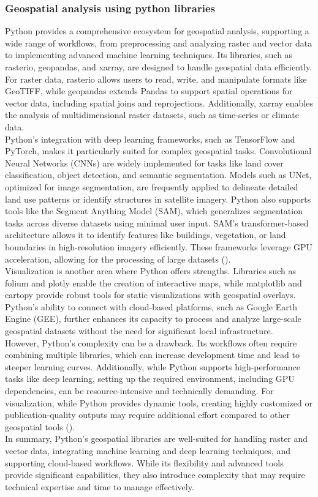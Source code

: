 \documentclass[a4paper,12pt]{article}
\begin{document}
\subsubsection{Geospatial analysis using python libraries}
Python provides a comprehensive ecosystem for geospatial analysis, supporting a wide range of workflows, from preprocessing and analyzing raster and vector data to implementing advanced machine learning techniques. Its libraries, such as rasterio, geopandas, and xarray, are designed to handle geospatial data efficiently. For raster data, rasterio allows users to read, write, and manipulate formats like GeoTIFF, while geopandas extends Pandas to support spatial operations for vector data, including spatial joins and reprojections. Additionally, xarray enables the analysis of multidimensional raster datasets, such as time-series or climate data.\\
Python’s integration with deep learning frameworks, such as TensorFlow and PyTorch, makes it particularly suited for complex geospatial tasks. Convolutional Neural Networks (CNNs) are widely implemented for tasks like land cover classification, object detection, and semantic segmentation. Models such as UNet, optimized for image segmentation, are frequently applied to delineate detailed land use patterns or identify structures in satellite imagery. Python also supports tools like the Segment Anything Model (SAM), which generalizes segmentation tasks across diverse datasets using minimal user input. SAM’s transformer-based architecture allows it to identify features like buildings, vegetation, or land boundaries in high-resolution imagery efficiently. These frameworks leverage GPU acceleration, allowing for the processing of large datasets (\cite{setu_segment_2024}).\\
Visualization is another area where Python offers strengths. Libraries such as folium and plotly enable the creation of interactive maps, while matplotlib and cartopy provide robust tools for static visualizations with geospatial overlays. Python's ability to connect with cloud-based platforms, such as Google Earth Engine (GEE), further enhances its capacity to process and analyze large-scale geospatial datasets without the need for significant local infrastructure.\\
However, Python's complexity can be a drawback. Its workflows often require combining multiple libraries, which can increase development time and lead to steeper learning curves. Additionally, while Python supports high-performance tasks like deep learning, setting up the required environment, including GPU dependencies, can be resource-intensive and technically demanding. For visualization, while Python provides dynamic tools, creating highly customized or publication-quality outputs may require additional effort compared to other geospatial tools (\cite{priyadharshini_r_2015}).\\
In summary, Python’s geospatial libraries are well-suited for handling raster and vector data, integrating machine learning and deep learning techniques, and supporting cloud-based workflows. While its flexibility and advanced tools provide significant capabilities, they also introduce complexity that may require technical expertise and time to manage effectively.
\end{document}
